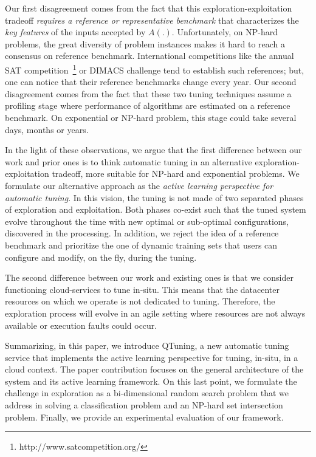 \documentclass[10pt, conference, compsocconf]{IEEEtran}
\begin{document}
Our first disagreement comes from the fact that this exploration-exploitation tradeoff {\it requires a reference or representative 
benchmark} that characterizes the {\it key features} of the inputs accepted by  $A(.)$. Unfortunately, on NP-hard problems, the great 
diversity of problem instances makes it hard to reach a consensus on reference benchmark. International competitions like the annual SAT 
competition~\footnote{http://www.satcompetition.org/} or DIMACS challenge tend to establish such references; but, one can notice 
that their reference benchmarks change every year. 
Our second disagreement comes from the fact that these two tuning techniques assume a profiling stage where performance of 
algorithms are estimated on a reference benchmark. On exponential or NP-hard problem, this stage could take several days, 
months or years. 


In the light of these observations, we argue that the first difference between our work and prior ones is to think 
automatic tuning in an alternative exploration-exploitation tradeoff, more suitable for NP-hard and exponential problems. 
We formulate our alternative approach as the {\it active learning perspective for automatic tuning}. 
In this vision, the tuning is not made of two separated phases of exploration and exploitation. Both phases co-exist 
such that the tuned system evolve throughout the time with new optimal or sub-optimal configurations, discovered in the processing. 
In addition, we reject the idea of a reference benchmark and prioritize the one of dynamic training sets that users 
can configure and modify, on the fly, during the tuning. 

The second difference between our work and existing ones is that we consider functioning cloud-services to tune in-situ. 
This means that the datacenter resources on which we operate is not dedicated to tuning. Therefore, the exploration process will  
evolve in an agile setting where resources are not always available or execution faults could occur. 

Summarizing, in this paper, we introduce QTuning, a new automatic tuning service that implements the active 
learning perspective for tuning, in-situ, in a cloud context. The paper contribution focuses on the general 
architecture of the system and its active learning framework. On this last point, we formulate the challenge in 
exploration as a bi-dimensional random search problem that we address in solving a classification problem and 
an NP-hard set intersection problem.  Finally, we provide an experimental evaluation of our framework.
\end{document}
